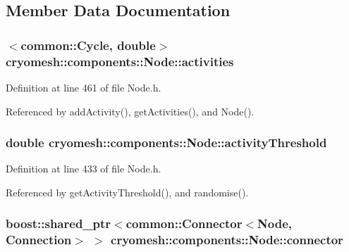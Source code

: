 \subsection{\-Member \-Data \-Documentation}
\hypertarget{classcryomesh_1_1components_1_1Node_a39bf3a9c006d8ee03769d6b86127e7cf}{
\subsubsection[{activities}]{$<${\bf common\-::\-Cycle}, double$>$ {\bf cryomesh\-::components\-::\-Node\-::activities}}}\label{classcryomesh_1_1components_1_1Node_a39bf3a9c006d8ee03769d6b86127e7cf}


\-Definition at line 461 of file \-Node.\-h.



\-Referenced by add\-Activity(), get\-Activities(), and \-Node().

\hypertarget{classcryomesh_1_1components_1_1Node_a270451d7286a4e6f344559a3d48d1193}{
\subsubsection[{activity\-Threshold}]{\setlength{\rightskip}{0pt plus 5cm}double {\bf cryomesh\-::components\-::\-Node\-::activity\-Threshold}}}\label{classcryomesh_1_1components_1_1Node_a270451d7286a4e6f344559a3d48d1193}


\-Definition at line 433 of file \-Node.\-h.



\-Referenced by get\-Activity\-Threshold(), and randomise().

\hypertarget{classcryomesh_1_1components_1_1Node_a43b68f9f1a83bca4d4fc4f55bb8dd8de}{
\subsubsection[{connector}]{\setlength{\rightskip}{0pt plus 5cm}boost\-::shared\-\_\-ptr$<${\bf common\-::\-Connector}$<${\bf \-Node}, {\bf \-Connection}$>$ $>$ {\bf cryomesh\-::components\-::\-Node\-::connector}}}\label{classcryomesh_1_1components_1_1Node_a43b68f9f1a83bca4d4fc4f55bb8dd8de}


